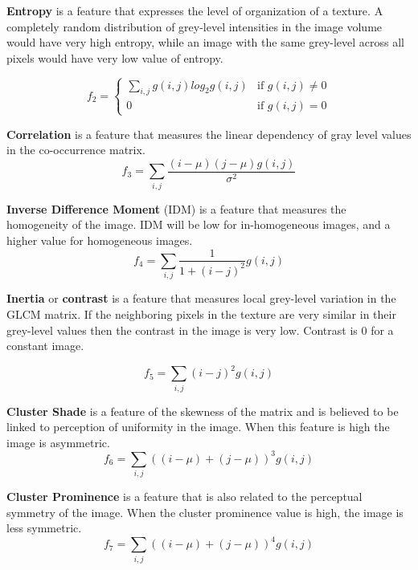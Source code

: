 \documentclass{InsightArticle}
\begin{document}
\textbf{Entropy} is a feature that expresses the level of organization of a texture. A completely random distribution of grey-level intensities in the image volume would have very high entropy, while an image with the same grey-level across all pixels would have very low value of entropy.

\begin{equation} \label{eqn:ShapeInfluenceTerm}
f_2 =
  \begin{cases}
     \sum_{i,j}\nolimits g(i, j)log_2g(i,j)  & \text{if } g(i, j) \neq 0 \\
     0                                       & \text{if } g(i, j) = 0
  \end{cases}
\end{equation}

\textbf{Correlation} is a feature that measures the linear dependency of gray level values in the co-occurrence matrix.
\begin{equation} \label{eqn:ShapeInfluenceTerm}
f_3 = \sum_{i,j}\nolimits \frac{(i-\mu)(j-\mu)g(i, j)}{\sigma^2}
\end{equation}

\textbf{Inverse Difference Moment} (IDM) is a feature that measures the homogeneity of the image.  IDM will be low for in-homogeneous images, and a higher value for homogeneous images.
\begin{equation} \label{eqn:ShapeInfluenceTerm}
f_4 = \sum_{i,j}\nolimits \frac{1}{1+(i-j)^2}g(i, j)
\end{equation}

\textbf{Inertia} or \textbf{contrast} is a feature that measures local grey-level variation in the GLCM matrix. If the neighboring pixels in the texture are very similar in their grey-level values then the contrast in the image is very low. Contrast is 0 for a constant image.

\begin{equation} \label{eqn:ShapeInfluenceTerm}
f_5 = \sum_{i,j}\nolimits (i-j)^2g(i, j)
\end{equation}

\textbf{Cluster Shade} is a feature of the skewness of the matrix and is believed to be linked to perception of uniformity in the image. When this feature is high the image is asymmetric.
\begin{equation} \label{eqn:ShapeInfluenceTerm}
f_6 = \sum_{i,j}\nolimits ((i - \mu)+(j-\mu))^3g(i, j)
\end{equation}

\textbf{Cluster Prominence} is a feature that is also related to the perceptual symmetry of the image. When the cluster prominence value is high, the image is less symmetric.
\begin{equation} \label{eqn:ShapeInfluenceTerm}
f_7 = \sum_{i,j}\nolimits ((i - \mu)+(j-\mu))^4g(i, j)
\end{equation}
\end{document}
